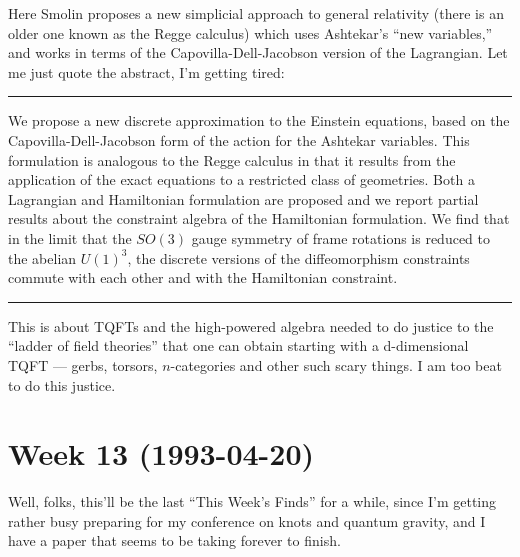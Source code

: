 \documentclass{article}
\def\tightlist{}
\renewcommand{\texttt}[1]{%
  \begingroup
  \ttfamily
  \begingroup\lccode`~=`/\lowercase{\endgroup\def~}{/\discretionary{}{}{}}%
  \begingroup\lccode`~=`[\lowercase{\endgroup\def~}{[\discretionary{}{}{}}%
  \begingroup\lccode`~=`.\lowercase{\endgroup\def~}{.\discretionary{}{}{}}%
  \catcode`/=\active\catcode`[=\active\catcode`.=\active
  \scantokens{#1\noexpand}%
  \endgroup
}
\begin{document}
Here Smolin proposes a new simplicial approach to general relativity
(there is an older one known as the Regge calculus) which uses
Ashtekar's ``new variables,'' and works in terms of the
Capovilla-Dell-Jacobson version of the Lagrangian. Let me just quote the
abstract, I'm getting tired:

\begin{center}\rule{0.5\linewidth}{0.5pt}\end{center}

We propose a new discrete approximation to the Einstein equations, based
on the Capovilla-Dell-Jacobson form of the action for the Ashtekar
variables. This formulation is analogous to the Regge calculus in that
it results from the application of the exact equations to a restricted
class of geometries. Both a Lagrangian and Hamiltonian formulation are
proposed and we report partial results about the constraint algebra of
the Hamiltonian formulation. We find that in the limit that the
\(SO(3)\) gauge symmetry of frame rotations is reduced to the abelian
\(U(1)^3\), the discrete versions of the diffeomorphism constraints
commute with each other and with the Hamiltonian constraint.

\begin{center}\rule{0.5\linewidth}{0.5pt}\end{center}


This is about TQFTs and the high-powered algebra needed to do justice to
the ``ladder of field theories'' that one can obtain starting with a
d-dimensional TQFT --- gerbs, torsors, \(n\)-categories and other such
scary things. I am too beat to do this justice.
\hypertarget{week13}{%
\section{Week 13 (1993-04-20)}\label{week13}}

Well, folks, this'll be the last ``This Week's Finds'' for a while,
since I'm getting rather busy preparing for my conference on knots and
quantum gravity, and I have a paper that seems to be taking forever to
finish.
\end{document}
